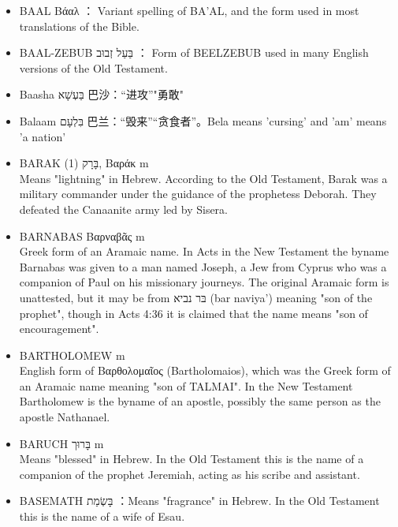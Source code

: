 \begin{itemize} 
\itemsep-.25em 
\item BAAL Βάαλ ： Variant spelling of BA'AL, and the form used in most translations of the Bible.

\item BAAL-ZEBUB בַּעַל זְבוּב ： Form of BEELZEBUB used in many English versions of the Old Testament.
\item Baasha בַּעְשָׁא‎ 巴沙：“进攻”"勇敢"
\item Balaam בִּלְעָם 巴兰：“毁来”“贪食者”。Bela means 'cursing' and 'am' means 'a nation'
\item {BARAK (1) בָּרָק, Βαράκ m}\\
Means "lightning" in Hebrew. According to the Old Testament, Barak was a military commander under the guidance of the prophetess Deborah. They defeated the Canaanite army led by Sisera.

\item {BARNABAS Βαρναβᾶς m}\\
Greek form of an Aramaic name. In Acts in the New Testament the byname Barnabas was given to a man named Joseph, a Jew from Cyprus who was a companion of Paul on his missionary journeys. The original Aramaic form is unattested, but it may be from בּר נביא (bar naviya') meaning "son of the prophet", though in Acts 4:36 it is claimed that the name means "son of encouragement".

\item {BARTHOLOMEW m}\\
English form of Βαρθολομαῖος (Bartholomaios), which was the Greek form of an Aramaic name meaning "son of TALMAI". In the New Testament Bartholomew is the byname of an apostle, possibly the same person as the apostle Nathanael. 

\item {BARUCH בָּרוּך m}\\
Means "blessed" in Hebrew. In the Old Testament this is the name of a companion of the prophet Jeremiah, acting as his scribe and assistant. 

\item BASEMATH בָּשְׂמַת ：Means "fragrance" in Hebrew. In the Old Testament this is the name of a wife of Esau.


\end{itemize}
